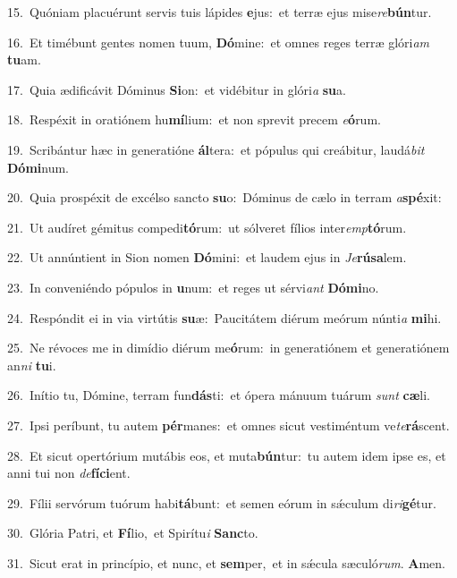 {\numbfont\textcolor{\numbcolor}{15.}}~Quóniam placuérunt servis tuis lápides \textbf{e}\-jus:~\star et terræ ejus mise\-\textit{re}\-\textbf{bún}tur.\par
{\numbfont\textcolor{\numbcolor}{16.}}~Et timébunt gentes nomen tuum, \textbf{Dó}\-mine:~\star et omnes reges terræ glóri\textit{am} \textbf{tu}\-am.\par
{\numbfont\textcolor{\numbcolor}{17.}}~Quia ædificávit Dóminus \textbf{Si}\-on:~\star et vidébitur in glóri\textit{a} \textbf{su}\-a.\par
{\numbfont\textcolor{\numbcolor}{18.}}~Respéxit in oratiónem hu\-\textbf{mí}\-lium:~\star et non sprevit precem \textit{e}\-\textbf{ó}rum.\par
{\numbfont\textcolor{\numbcolor}{19.}}~Scribántur hæc in generatióne \textbf{ál}\-tera:~\star et pópulus qui creábitur, laudá\textit{bit} \textbf{Dó}\-\textbf{mi}num.\par
{\numbfont\textcolor{\numbcolor}{20.}}~Quia prospéxit de excélso sancto \textbf{su}\-o:~\star Dóminus de cælo in terram \textit{a}\-\textbf{spé}xit:\par
{\numbfont\textcolor{\numbcolor}{21.}}~Ut audíret gémitus compedi\-\textbf{tó}\-rum:~\star ut sólveret fílios inter\-\textit{emp}\-\textbf{tó}rum.\par
{\numbfont\textcolor{\numbcolor}{22.}}~Ut annúntient in Sion nomen \textbf{Dó}\-mini:~\star et laudem ejus in \textit{Je}\-\textbf{rú}\textbf{sa}lem.\par
{\numbfont\textcolor{\numbcolor}{23.}}~In conveniéndo pópulos in \textbf{u}\-num:~\star et reges ut sérvi\textit{ant} \textbf{Dó}\-\textbf{mi}no.\par
{\numbfont\textcolor{\numbcolor}{24.}}~Respóndit ei in via virtútis \textbf{su}\-æ:~\star Paucitátem diérum meórum núnti\textit{a} \textbf{mi}\-hi.\par
{\numbfont\textcolor{\numbcolor}{25.}}~Ne révoces me in dimídio diérum me\-\textbf{ó}\-rum:~\star in generatiónem et generatiónem an\textit{ni} \textbf{tu}\-i.\par
{\numbfont\textcolor{\numbcolor}{26.}}~Inítio tu, Dómine, terram fun\-\textbf{dás}\-ti:~\star et ópera mánuum tuárum \textit{sunt} \textbf{cæ}\-li.\par
{\numbfont\textcolor{\numbcolor}{27.}}~Ipsi períbunt, tu autem \textbf{pér}\-manes:~\star et omnes sicut vestiméntum ve\-\textit{te}\-\textbf{rá}scent.\par
{\numbfont\textcolor{\numbcolor}{28.}}~Et sicut opertórium mutábis eos, et muta\-\textbf{bún}\-tur:~\star tu autem idem ipse es, et anni tui non \textit{de}\-\textbf{fí}\textbf{ci}ent.\par
{\numbfont\textcolor{\numbcolor}{29.}}~Fílii servórum tuórum habi\-\textbf{tá}\-bunt:~\star et semen eórum in sǽculum di\-\textit{ri}\-\textbf{gé}tur.\par
{\numbfont\textcolor{\numbcolor}{30.}}~Glória Patri, et \textbf{Fí}\-lio,~\star et Spirítu\textit{i} \textbf{Sanc}\-to.\par
{\numbfont\textcolor{\numbcolor}{31.}}~Sicut erat in princípio, et nunc, et \textbf{sem}\-per,~\star et in sǽcula sæculó\-\textit{rum}\-. \textbf{A}\-men.\par
